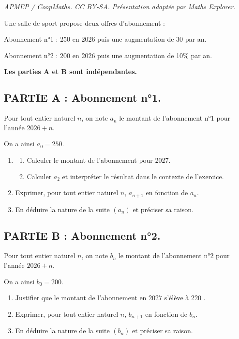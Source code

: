 \documentclass[10pt]{article}
\providecommand{\euro}{\texteuro}
\providecommand{\euro}{{\text{€}}}
\renewcommand{\euro}{\ifmmode\text{\texteuro}\else\texteuro\fi}
\begin{document}
\noindent\textit{APMEP / CoopMaths. CC BY-SA. Présentation adaptée par Maths Explorer.}\par\medskip
Une salle de sport propose deux offres d'abonnement :

Abonnement n°1 : 250 \euro{} en 2026 puis une augmentation de 30 \euro{} par an.

Abonnement n°2 : 200 \euro{} en 2026 puis une augmentation de 10\% par an.

\textbf{Les parties A et B sont indépendantes.}


\subsection*{PARTIE A : Abonnement n°1.}

Pour tout entier naturel $n$, on note $a_n$ le montant de l'abonnement n°1 pour l'année $2026+n$.

On a ainsi $a_0=250$.
\begin{enumerate}
\item
\begin{enumerate}[label=\alph*)]
\item Calculer le montant de l'abonnement pour 2027.
\item Calculer $a_2$ et interpréter le résultat dans le contexte de l'exercice.
\end{enumerate}
\item Exprimer, pour tout entier naturel $n$, $a_{n+1}$ en fonction de $a_n$.
\item En déduire la nature de la suite $(a_n)$ et 
préciser sa raison.
\end{enumerate}

\bigskip

\subsection*{PARTIE B : Abonnement n°2.}

Pour tout entier naturel $n$, on note $b_n$ le montant de l'abonnement n°2 pour l'année $2026+n$.

On a ainsi $b_0=200$.
\begin{enumerate}
\item Justifier que le montant de l'abonnement en 2027 s'élève à 220 \euro{}.
\item Exprimer, pour tout entier naturel $n$, $b_{n+1}$ en fonction de $b_n$.
\item En déduire la nature de la suite $(b_n)$ et préciser sa raison.
\end{enumerate}
\end{document}
